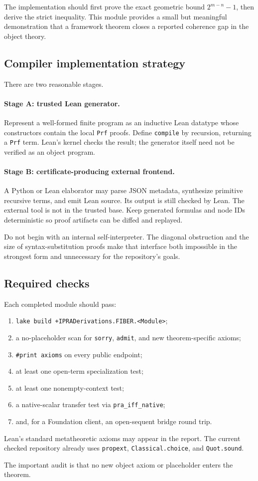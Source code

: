 The implementation should first prove the exact geometric bound
\(2^{m-n}-1\), then derive the strict inequality.  This module provides a
small but meaningful demonstration that a framework theorem closes a reported
coherence gap in the object theory.

\subsection{Compiler implementation strategy}

There are two reasonable stages.

\paragraph{Stage A: trusted Lean generator.}
Represent a well-formed finite program as an inductive Lean datatype whose
constructors contain the local \texttt{Prf} proofs.  Define
\texttt{compile} by recursion, returning a \texttt{Prf} term.  Lean's kernel
checks the result; the generator itself need not be verified as an object
program.

\paragraph{Stage B: certificate-producing external frontend.}
A Python or Lean elaborator may parse JSON metadata, synthesize primitive
recursive terms, and emit Lean source.  Its output is still checked by Lean.
The external tool is not in the trusted base.  Keep generated formulas and
node IDs deterministic so proof artifacts can be diffed and replayed.

Do not begin with an internal self-interpreter.  The diagonal obstruction and
the size of syntax-substitution proofs make that interface both impossible in
the strongest form and unnecessary for the repository's goals.

\subsection{Required checks}

Each completed module should pass:

\begin{enumerate}
\item \texttt{lake build +IPRADerivations.FIBER.<Module>};
\item a no-placeholder scan for \texttt{sorry}, \texttt{admit}, and new
      theorem-specific axioms;
\item \texttt{\#print axioms} on every public endpoint;
\item at least one open-term specialization test;
\item at least one nonempty-context test;
\item a native-scalar transfer test via \texttt{pra\_iff\_native};
\item and, for a Foundation client, an open-sequent bridge round trip.
\end{enumerate}

Lean's standard metatheoretic axioms may appear in the report.  The current
checked repository already uses \texttt{propext},
\texttt{Classical.choice}, and \texttt{Quot.sound}.

The important audit is that no new object axiom or placeholder enters the
theorem.
